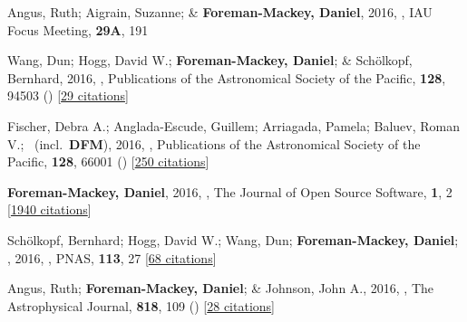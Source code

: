 \item[{\color{numcolor}\scriptsize20}] Angus, Ruth; Aigrain, Suzanne; \& \textbf{Foreman-Mackey, Daniel}, 2016, , IAU Focus Meeting, \textbf{29A}, 191

\item[{\color{numcolor}\scriptsize19}] Wang, Dun; Hogg, David W.; \textbf{Foreman-Mackey, Daniel}; \& Sch{\"o}lkopf, Bernhard, 2016, , Publications of the Astronomical Society of the Pacific, \textbf{128}, 94503 () [\href{https://ui.adsabs.harvard.edu/abs/2016PASP..128i4503W}{29 citations}]

\item[{\color{numcolor}\scriptsize18}] Fischer, Debra A.; Anglada-Escude, Guillem; Arriagada, Pamela; Baluev, Roman V.; \etal\ (incl.\ \textbf{DFM}), 2016, , Publications of the Astronomical Society of the Pacific, \textbf{128}, 66001 () [\href{https://ui.adsabs.harvard.edu/abs/2016PASP..128f6001F}{250 citations}]

\item[{\color{numcolor}\scriptsize17}] \textbf{Foreman-Mackey, Daniel}, 2016, , The Journal of Open Source Software, \textbf{1}, 2 [\href{https://scholar.google.com/scholar?cites=1835087844145558435,17325274697099535179,14220488595059618709,12820425635803494730,7284810048757141243,17415935839493019063}{1940 citations}]

\item[{\color{numcolor}\scriptsize16}] Sch{\"o}lkopf, Bernhard; Hogg, David W.; Wang, Dun; \textbf{Foreman-Mackey, Daniel}; \etal, 2016, , PNAS, \textbf{113}, 27 [\href{https://scholar.google.com/scholar?cites=2429561747341807338}{68 citations}]

\item[{\color{numcolor}\scriptsize15}] Angus, Ruth; \textbf{Foreman-Mackey, Daniel}; \& Johnson, John A., 2016, , The Astrophysical Journal, \textbf{818}, 109 () [\href{https://ui.adsabs.harvard.edu/abs/2016ApJ...818..109A}{28 citations}]

